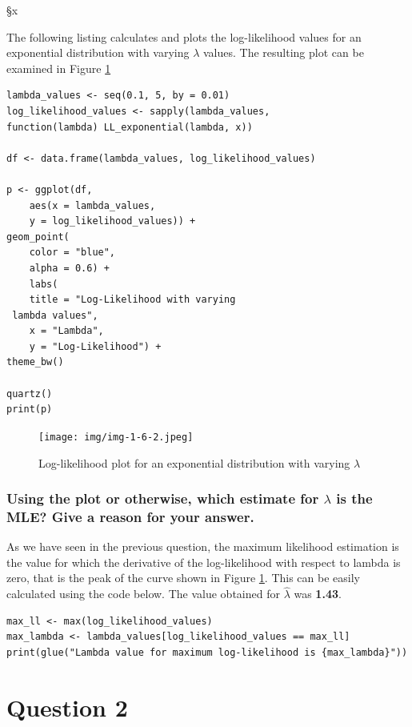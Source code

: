 §x\documentclass[]{article}
\begin{document}
The following listing calculates and plots the log-likelihood values for an exponential distribution with varying $\lambda$ values. The resulting plot can be examined in Figure \ref{fig:img-1-6-2}


\begin{lstlisting}
lambda_values <- seq(0.1, 5, by = 0.01)
log_likelihood_values <- sapply(lambda_values,
function(lambda) LL_exponential(lambda, x))

df <- data.frame(lambda_values, log_likelihood_values)

p <- ggplot(df, 
	aes(x = lambda_values, 
	y = log_likelihood_values)) +
geom_point(
	color = "blue",
	alpha = 0.6) +
	labs(
	title = "Log-Likelihood with varying
 lambda values",
	x = "Lambda",
	y = "Log-Likelihood") +
theme_bw()

quartz()
print(p)
\end{lstlisting}

\begin{figure}[H]
	\centering
	\texttt{[image: img/img-1-6-2.jpeg]}
	\caption{Log-likelihood plot for an exponential distribution with varying $\lambda$}
	\label{fig:img-1-6-2}
\end{figure}


\subsubsection{Using the plot or otherwise, which estimate for $\lambda$ is the MLE? Give a reason for your answer.}

As we have seen in the previous question, the maximum likelihood estimation is the value for which the derivative of the log-likelihood with respect to lambda is zero, that is the peak of the curve shown in Figure \ref*{fig:img-1-6-2}. This can be easily calculated using the code below. The value obtained for $\hat{\lambda}$ was \textbf{1.43}.

\begin{lstlisting}
max_ll <- max(log_likelihood_values)
max_lambda <- lambda_values[log_likelihood_values == max_ll]
print(glue("Lambda value for maximum log-likelihood is {max_lambda}"))
\end{lstlisting}


\section{Question 2}
\end{document}
